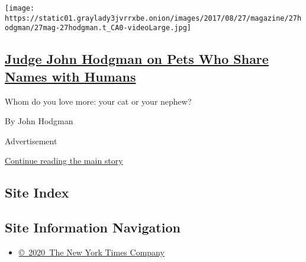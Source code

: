 \begin{enumerate}
  \texttt{[image: https://static01.graylady3jvrrxbe.onion/images/2017/08/27/magazine/27hodgman/27mag-27hodgman.t\_CA0-videoLarge.jpg]}

  \hypertarget{judge-john-hodgman-on-pets-who-share-names-with-humans}{%
  \subsection{\texorpdfstring{\href{/2017/08/25/magazine/judge-john-hodgman-on-pets-who-share-names-with-humans.html}{Judge
  John Hodgman on Pets Who Share Names with
  Humans}}{Judge John Hodgman on Pets Who Share Names with Humans}}\label{judge-john-hodgman-on-pets-who-share-names-with-humans}}

  Whom do you love more: your cat or your nephew?

  By John Hodgman
\end{enumerate}

Advertisement

\protect\hyperlink{after-mid1}{Continue reading the main story}

\hypertarget{site-index}{%
\subsection{Site Index}\label{site-index}}

\hypertarget{site-information-navigation}{%
\subsection{Site Information
Navigation}\label{site-information-navigation}}

\begin{itemize}
\tightlist
\item
  \href{https://help.nytimes3xbfgragh.onion/hc/en-us/articles/115014792127-Copyright-notice}{©~2020~The
  New York Times Company}
\end{itemize}

